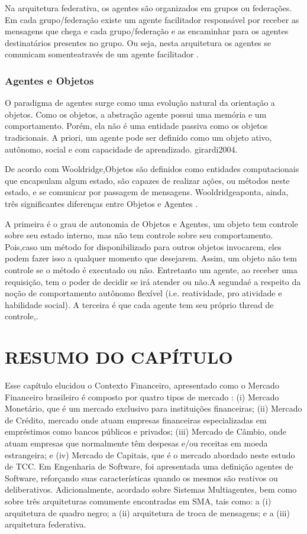 Na arquitetura federativa, os agentes são organizados em grupos ou federações. Em cada grupo/federação existe um agente facilitador responsável por receber as mensagens que chega e cada grupo/federação e as encaminhar para os agentes destinatários presentes no grupo. Ou seja, nesta arquitetura os agentes se comunicam somenteatravés de um agente facilitador \cite[p. 8]{girardi2004}.


\subsubsection{Agentes e Objetos}

O paradigma de agentes surge como uma evolução natural da orientação a objetos. Como os objetos, a abstração agente possui uma memória e um comportamento. Porém, ela não é uma entidade passiva como os objetos tradicionais. A priori, um agente pode ser definido como um objeto ativo, autônomo, social e com capacidade de aprendizado. 
\newline {} {girardi2004}.


De acordo com Wooldridge,Objetos são definidos como entidades computacionais que encapsulam algum estado, são capazes de realizar ações, ou métodos neste estado, e se comunicar por passagem de mensagens. Wooldridgeaponta, ainda, três significantes diferenças entre Objetos e Agentes \cite[p. 25-27]{wooldrige2002}. 

A primeira é o grau de autonomia de Objetos e Agentes, um objeto tem controle sobre seu estado interno, mas não tem controle sobre seu comportamento. Pois,caso um método for disponibilizado para outros objetos invocarem, eles podem fazer isso a qualquer momento que desejarem. Assim, um objeto não tem controle se o método é executado ou não. Entretanto um agente, ao receber uma requisição, tem o poder de decidir se irá atender ou não.A segundaé a respeito da noção de comportamento autônomo flexível (i.e. reatividade, pro atividade e habilidade social). A terceira é que cada agente tem seu próprio thread de controle,\cite[p. 25-27]{wooldrige2002}.


\section{RESUMO DO CAPÍTULO}

Esse capítulo elucidou o Contexto Financeiro, apresentado como o Mercado Financeiro brasileiro é composto por quatro tipos de mercado \cite[p. 15]{cvm2013}: (i) Mercado Monetário, que é um mercado exclusivo para instituições financeiras; (ii) Mercado de Crédito, mercado onde atuam empresas financeiras especializadas em empréstimos como bancos públicos e privados; (iii) Mercado de Câmbio, onde atuam empresas que normalmente têm despesas e/ou receitas em moeda estrangeira; e (iv) Mercado de Capitais, que é o mercado abordado neste estudo de TCC. Em Engenharia de Software, foi apresentada uma definição agentes de Software, reforçando suas características quando os mesmos são reativos ou deliberativos. Adicionalmente, acordado sobre Sistemas Multiagentes, bem como sobre três arquiteturas comumente encontradas em SMA, tais como: a (i) arquitetura de quadro negro; a (ii) arquitetura de troca de mensagens; e a (iii) arquitetura federativa.
\newpage
